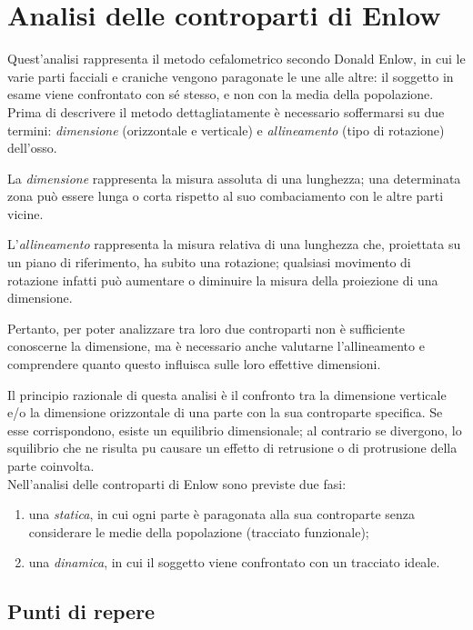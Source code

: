 \chapter{Analisi delle controparti di Enlow}
Quest'analisi rappresenta il metodo cefalometrico secondo Donald Enlow, in cui le varie parti facciali e craniche vengono paragonate le une alle altre: il soggetto in esame viene confrontato con sé stesso, e non con la media della popolazione.\\

Prima di descrivere il metodo dettagliatamente è necessario soffermarsi su due termini: \emph{dimensione} (orizzontale e verticale) e \emph{allineamento} (tipo di rotazione) dell'osso.

La \emph{dimensione} rappresenta la misura assoluta di una lunghezza; una determinata zona può essere lunga o corta rispetto al suo combaciamento con le altre parti vicine.

L'\emph{allineamento} rappresenta la misura relativa di una lunghezza che, proiettata su un piano di riferimento, ha subito una rotazione; qualsiasi movimento di rotazione infatti può aumentare o diminuire la misura della proiezione di una dimensione.

Pertanto, per poter analizzare tra loro due controparti non è sufficiente conoscerne la dimensione, ma è necessario anche valutarne l'allineamento e comprendere quanto questo influisca sulle loro effettive dimensioni.

Il principio razionale di questa analisi è il confronto tra la dimensione verticale e/o la dimensione orizzontale di una parte con la sua controparte specifica. Se esse corrispondono, esiste un equilibrio dimensionale; al contrario se divergono, lo squilibrio che ne risulta pu causare un effetto di retrusione o di protrusione della parte coinvolta.\\

Nell'analisi delle controparti di Enlow sono previste due fasi:
\begin{enumerate}
\item una \emph{statica}, in cui ogni parte è paragonata alla sua controparte senza considerare le medie della popolazione (tracciato funzionale);
\item una \emph{dinamica}, in cui il soggetto viene confrontato con un tracciato ideale.
\end{enumerate}

\section{Punti di repere}
